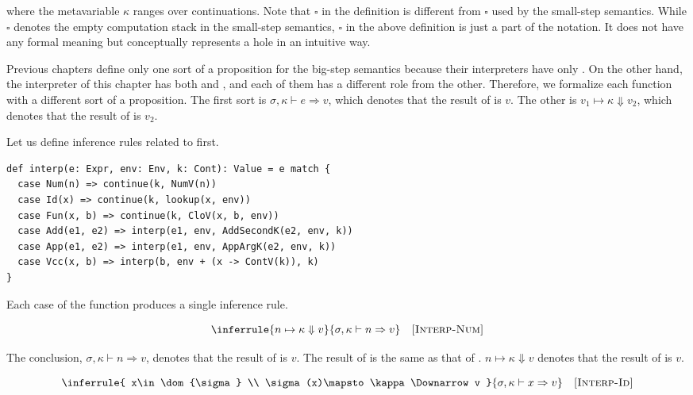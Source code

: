 where the metavariable $\kappa$ ranges over continuations.
Note that $\square$ in the definition is different from $\square$ used by the
small-step semantics. While $\square$ denotes the empty computation stack in the
small-step semantics, $\square$ in the above definition is just a part of the
notation. It does not have any formal meaning but conceptually represents a hole
in an intuitive way.

Previous chapters define only one sort of a proposition for the big-step
semantics because their interpreters have only . On the other hand,
the interpreter of this chapter has both  and , and
each of them has a different role from the other. Therefore, we formalize each
function with a different sort of a proposition. The first sort is
$\sigma,\kappa\vdash e\Rightarrow v$, which denotes that the result of
 is $v$. The other is
$v_1\mapsto\kappa\Downarrow v_2$, which denotes that the result of
 is $v_2$.

Let us define inference rules related to  first.

\begin{verbatim}
def interp(e: Expr, env: Env, k: Cont): Value = e match {
  case Num(n) => continue(k, NumV(n))
  case Id(x) => continue(k, lookup(x, env))
  case Fun(x, b) => continue(k, CloV(x, b, env))
  case Add(e1, e2) => interp(e1, env, AddSecondK(e2, env, k))
  case App(e1, e2) => interp(e1, env, AppArgK(e2, env, k))
  case Vcc(x, b) => interp(b, env + (x -> ContV(k)), k)
}
\end{verbatim}

Each case of the  function produces a single inference rule.

\[
  \inferrule
  { n\mapsto\kappa\Downarrow v }
  { \sigma,\kappa\vdash n\Rightarrow v }
  \quad\textsc{[Interp-Num]}
\]

The conclusion, $\sigma,\kappa\vdash n\Rightarrow v$, denotes that the result of
 is $v$. The result of  is the same as that of .
$n\mapsto\kappa\Downarrow v$ denotes that the result of  is $v$.

\[
  \inferrule
  { x\in\dom{\sigma} \\ \sigma(x)\mapsto\kappa\Downarrow v }
  { \sigma,\kappa\vdash x\Rightarrow v }
  \quad\textsc{[Interp-Id]}
\]

